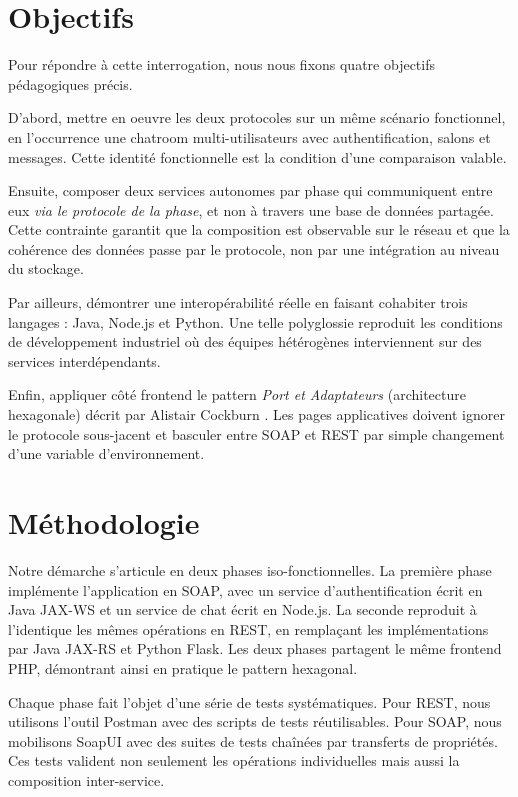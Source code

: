 \section*{Objectifs}

Pour répondre à cette interrogation, nous nous fixons quatre objectifs pédagogiques précis.

D'abord, mettre en oeuvre les deux protocoles sur un même scénario fonctionnel, en l'occurrence une chatroom multi-utilisateurs avec authentification, salons et messages. Cette identité fonctionnelle est la condition d'une comparaison valable.

Ensuite, composer deux services autonomes par phase qui communiquent entre eux \emph{via le protocole de la phase}, et non à travers une base de données partagée. Cette contrainte garantit que la composition est observable sur le réseau et que la cohérence des données passe par le protocole, non par une intégration au niveau du stockage.

Par ailleurs, démontrer une interopérabilité réelle en faisant cohabiter trois langages : Java, Node.js et Python. Une telle polyglossie reproduit les conditions de développement industriel où des équipes hétérogènes interviennent sur des services interdépendants.

Enfin, appliquer côté frontend le pattern \emph{Port et Adaptateurs} (architecture hexagonale) décrit par Alistair Cockburn \citep{cockburn2005}. Les pages applicatives doivent ignorer le protocole sous-jacent et basculer entre SOAP et REST par simple changement d'une variable d'environnement.

\section*{Méthodologie}

Notre démarche s'articule en deux phases iso-fonctionnelles. La première phase implémente l'application en SOAP, avec un service d'authentification écrit en Java JAX-WS et un service de chat écrit en Node.js. La seconde reproduit à l'identique les mêmes opérations en REST, en remplaçant les implémentations par Java JAX-RS et Python Flask. Les deux phases partagent le même frontend PHP, démontrant ainsi en pratique le pattern hexagonal.

Chaque phase fait l'objet d'une série de tests systématiques. Pour REST, nous utilisons l'outil Postman avec des scripts de tests réutilisables. Pour SOAP, nous mobilisons SoapUI avec des suites de tests chaînées par transferts de propriétés. Ces tests valident non seulement les opérations individuelles mais aussi la composition inter-service.

